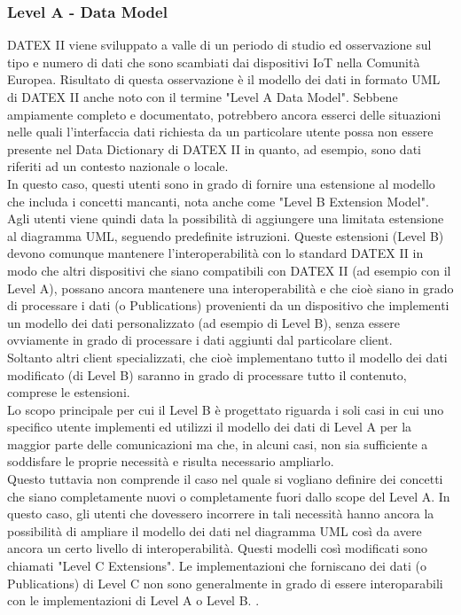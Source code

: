 \subsubsection{Level A - Data Model}
DATEX II viene sviluppato a valle di un periodo di studio ed osservazione sul tipo e numero di dati che sono scambiati dai dispositivi IoT nella Comunità Europea. Risultato di questa osservazione è il modello dei dati in formato UML di DATEX II anche noto con il termine "Level A Data Model". Sebbene ampiamente completo e documentato, potrebbero ancora esserci delle situazioni nelle quali l'interfaccia dati richiesta da un particolare utente possa non essere presente nel Data Dictionary di DATEX II in quanto, ad esempio, sono dati riferiti ad un contesto nazionale o locale.\\
In questo caso, questi utenti sono in  grado di fornire una estensione al modello che includa i concetti mancanti, nota anche come "Level B Extension Model". Agli utenti viene quindi data la possibilità di aggiungere una limitata estensione al diagramma UML, seguendo predefinite istruzioni. Queste estensioni (Level B) devono comunque mantenere l'interoperabilità con lo standard DATEX II in modo che altri dispositivi che siano compatibili con DATEX II (ad esempio con il Level A), possano ancora mantenere una interoperabilità e che cioè siano in grado di processare i dati (o Publications) provenienti da un dispositivo che implementi un modello dei dati personalizzato (ad esempio di Level B), senza essere ovviamente in grado di processare i dati aggiunti dal particolare client.\\
Soltanto altri client specializzati, che cioè implementano tutto il modello dei dati modificato (di Level B) saranno in grado di processare tutto il contenuto, comprese le estensioni.\\
Lo scopo principale per cui il Level B è progettato riguarda i soli casi in cui uno specifico utente implementi ed utilizzi il modello dei dati di Level A per la maggior parte delle comunicazioni ma che, in alcuni casi, non sia sufficiente a soddisfare le proprie necessità e risulta necessario ampliarlo.\\
Questo tuttavia non comprende il caso nel quale si vogliano definire dei concetti che siano completamente nuovi o completamente fuori dallo scope del Level A. In questo caso, gli utenti che dovessero incorrere in tali necessità hanno ancora la possibilità di ampliare il modello dei dati nel diagramma UML così da avere ancora un certo livello di interoperabilità. Questi modelli così modificati sono chiamati "Level C Extensions". Le implementazioni che forniscano dei dati (o Publications) di Level C non sono generalmente in grado di essere interoparabili con le implementazioni di Level A o Level B.
.
